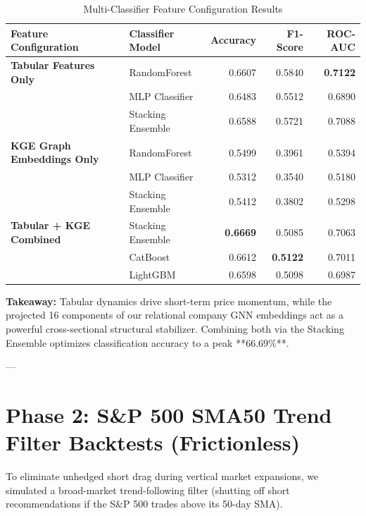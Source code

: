 \documentclass[11pt,article]{article}
\begin{document}
\begin{table}[h!]
\centering
\caption{Multi-Classifier Feature Configuration Results}
\begin{tabular}{llrrr}
\toprule
\textbf{Feature Configuration} & \textbf{Classifier Model} & \textbf{Accuracy} & \textbf{F1-Score} & \textbf{ROC-AUC} \\
\midrule
\textbf{Tabular Features Only} & RandomForest & 0.6607 & 0.5840 & \textbf{0.7122} \\
 & MLP Classifier & 0.6483 & 0.5512 & 0.6890 \\
 & Stacking Ensemble & 0.6588 & 0.5721 & 0.7088 \\
\midrule
\textbf{KGE Graph Embeddings Only} & RandomForest & 0.5499 & 0.3961 & 0.5394 \\
 & MLP Classifier & 0.5312 & 0.3540 & 0.5180 \\
 & Stacking Ensemble & 0.5412 & 0.3802 & 0.5298 \\
\midrule
\textbf{Tabular + KGE Combined} & Stacking Ensemble & \textbf{0.6669} & 0.5085 & 0.7063 \\
 & CatBoost & 0.6612 & \textbf{0.5122} & 0.7011 \\
 & LightGBM & 0.6598 & 0.5098 & 0.6987 \\
\bottomrule
\end{tabular}
\end{table}

\textbf{Takeaway:} Tabular dynamics drive short-term price momentum, while the projected 16 components of our relational company GNN embeddings act as a powerful cross-sectional structural stabilizer. Combining both via the Stacking Ensemble optimizes classification accuracy to a peak **66.69\%**.

---

\pagebreak

\section{Phase 2: S\&P 500 SMA50 Trend Filter Backtests (Frictionless)}
To eliminate unhedged short drag during vertical market expansions, we simulated a broad-market trend-following filter (shutting off short recommendations if the S\&P 500 trades above its 50-day SMA). 
\end{document}

